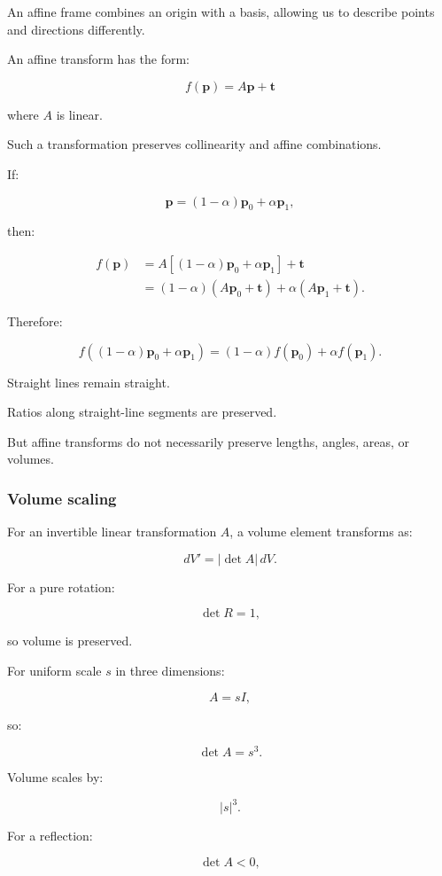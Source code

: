 An affine frame combines an origin with a basis, allowing us to describe points and directions differently.

An affine transform has the form:

\[
 \boxed{ f(\mathbf p)=A\mathbf p+\mathbf t }
\]

where \(A\) is linear.

Such a transformation preserves collinearity and affine combinations.

If:

\[
 \mathbf p=(1-\alpha)\mathbf p_0+\alpha\mathbf p_1,
\]

then:

\[
 \begin{aligned} f(\mathbf p) &= A[(1-\alpha)\mathbf p_0+\alpha\mathbf p_1]+\mathbf t\\ &=(1-\alpha)(A\mathbf p_0+\mathbf t) +\alpha(A\mathbf p_1+\mathbf t). \end{aligned}
\]

Therefore:

\[
 \boxed{ f((1-\alpha)\mathbf p_0+\alpha\mathbf p_1) = (1-\alpha)f(\mathbf p_0)+\alpha f(\mathbf p_1) }.
\]

Straight lines remain straight.

Ratios along straight-line segments are preserved.

But affine transforms do not necessarily preserve lengths, angles, areas, or volumes.

\subsubsection{Volume scaling}\label{volume-scaling}

For an invertible linear transformation \(A\), a volume element transforms as:

\[
 \boxed{ dV'=|\det A|\,dV }.
\]

For a pure rotation:

\[
 \det R=1,
\]

so volume is preserved.

For uniform scale \(s\) in three dimensions:

\[
 A=sI,
\]

so:

\[
 \det A=s^3.
\]

Volume scales by:

\[
 |s|^3.
\]

For a reflection:

\[
 \det A<0,
\]

